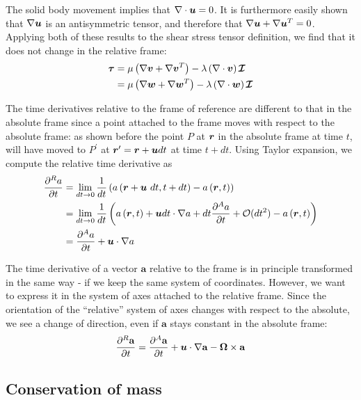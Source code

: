The solid body movement implies that $\nabla \cdot \boldsymbol {u} = 0$. It is
furthermore easily shown that $\nabla \boldsymbol {u}$ is an antisymmetric
tensor, and therefore that $\nabla \boldsymbol {u} + \nabla \boldsymbol {u}^T=0$. Applying
both of these results to the shear stress tensor definition, we find
that it does not change in the relative frame:
\begin{align*}
  \boldsymbol {\tau} 
  &= \mu \left(\nabla \boldsymbol {v} + \nabla \boldsymbol {v}^T\right) - \lambda \left(\nabla \cdot \boldsymbol {v}\right) \boldsymbol {\mathcal I} \\
  &= \mu \left(\nabla \boldsymbol {w} + \nabla \boldsymbol {w}^T\right) - \lambda \left(\nabla \cdot \boldsymbol {w}\right) \boldsymbol {\mathcal I}
\end{align*}

The time derivatives relative to the frame of reference are different
to that in the absolute frame since a point attached to the frame
moves with respect to the absolute frame: as shown before the point
$P$ at $\boldsymbol {r}$ in the absolute frame at time $t$, will have moved to
$P^\prime$ at $\boldsymbol {r}^\prime = \boldsymbol {r} + \boldsymbol {u} dt$ at time $t +
dt$. Using Taylor expansion, we compute the relative time derivative
as
\begin{align*}
  \frac{\partial^R a}{\partial t} &= \lim_{dt\rightarrow 0} \frac{1}{dt} 
  \left(a\left(\boldsymbol {r}+\boldsymbol {u}~dt,t+dt\right) - a\left(\boldsymbol {r},t\right)\right) \\
  &= \lim_{dt\rightarrow 0} \frac{1}{dt} \left(a\left(\boldsymbol {r},t\right) + \boldsymbol {u} dt \cdot \nabla a + dt \frac{\partial^A a}{\partial t} + \mathcal O(dt^2) - a\left(\boldsymbol {r},t\right)\right) \\
  &= \frac{\partial^A a}{\partial t} + \boldsymbol {u} \cdot \nabla a
\end{align*}

The time derivative of a vector $\mathbf a$ relative to the frame is
in principle transformed in the same way - if we keep the same system
of coordinates. However, we want to express it in the system of axes
attached to the relative frame. Since the orientation of the
``relative'' system of axes changes with respect to the absolute, we
see a change of direction, even if $\mathbf a$ stays constant in the
absolute frame:
\begin{align*}
  \frac{\partial^R \mathbf a}{\partial t} = 
  \frac{\partial^A \mathbf a}{\partial t} + 
  \boldsymbol {u} \cdot \nabla \mathbf a - 
  \boldsymbol {\Omega} \times \mathbf a
\end{align*}

\subsection{Conservation of mass}

